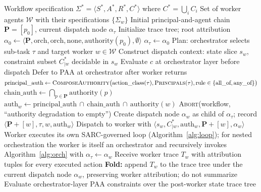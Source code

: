\documentclass[11pt,a4paper]{article}
\theoremstyle{remark}
\begin{document}
\begin{algorithm}[!htbp]
\caption{SARC-Governed Orchestrator Loop}
\label{alg:orch}
\begin{algorithmic}[1]
\Require Workflow specification $\Sigma^* = \langle S^*, A^*, R^*, C^* \rangle$ where $C^* = \bigcup_i C_i$
\Require Set of worker agents $\mathcal{W}$ with their specifications $\{\Sigma_w\}$
\Require Initial principal-and-agent chain $\mathbf{P} = [p_0]$, current dispatch node $\alpha_\tau$
\State Initialize trace tree; root attribution $\alpha_0 \gets \langle \mathbf{P}, \text{orch}, \text{orch}, \text{none}, \text{authority}(p_0), \emptyset \rangle$
\State $\alpha_\tau \gets \alpha_0$ 
    \State Plan: orchestrator selects sub-task $\tau$ and target worker $w \in \mathcal{W}$
    \State Construct dispatch context: state slice $s_w$, constraint subset $C^*_{|w}$ decidable in $s_w$
            \State Evaluate $c$ at orchestrator layer before dispatch 
        \Else
            \State Defer to PAA at orchestrator after worker returns
        \EndIf
    \EndFor
    \State $\text{principal\_auth} \gets \textsc{ComposeAuthority}\bigl(\text{action\_class}(\tau), \textsc{Principals}(\tau), \text{rule} \in \{\text{all\_of}, \text{any\_of}\}\bigr)$
    \State $\text{chain\_auth} \gets \bigcap_{p \in \mathbf{P}} \text{authority}(p)$
    \State $\text{auth}_w \gets \text{principal\_auth} \,\cap\, \text{chain\_auth} \,\cap\, \text{authority}(w)$
        \State \textsc{Abort}(workflow, ``authority degradation to empty'') 
    \EndIf
    \State Create dispatch node $\alpha_w$ as child of $\alpha_\tau$; record $\langle \mathbf{P} + [w], \tau, w, \text{auth}_w \rangle$
    \State Dispatch to worker with $\langle s_w, C^*_{|w}, \text{auth}_w, \mathbf{P} + [w], \alpha_w \rangle$
    \State Worker executes its own SARC-governed loop (Algorithm~\ref{alg:loop}); for nested orchestration the worker is itself an orchestrator and recursively invokes Algorithm~\ref{alg:orch} with $\alpha_\tau \gets \alpha_w$
    \State Receive worker trace $T_w$ with attribution tuples for every executed action
    \State \textbf{Fold:} append $T_w$ to the trace tree under the current dispatch node $\alpha_w$, preserving worker attribution; do not summarize
    \State Evaluate orchestrator-layer PAA constraints over the post-worker state
\EndWhile
\State \Return trace tree 
\end{algorithmic}
\end{algorithm}
\end{document}
